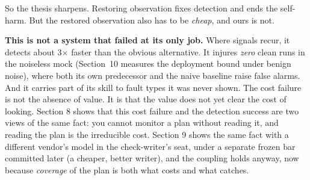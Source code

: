 \documentclass[acmsmall,screen]{acmart}
\begin{document}
So the thesis sharpens. Restoring observation fixes detection and ends the
self-harm. But the restored observation also has to be \emph{cheap}, and ours
is not.

\textbf{This is not a system that failed at its only job.} Where signals
recur, it detects about 3$\times$ faster than the obvious alternative. It
injures \emph{zero} clean runs in the noiseless mock (Section~10 measures the deployment
bound under benign noise), where both its own predecessor and the naive
baseline raise false alarms. And it carries part of its skill to fault types it
was never shown. The cost failure is not the absence of value. It is that the
value does not yet clear the cost of looking. Section 8 shows that this cost
failure and the detection success are two views of the same fact: you cannot
monitor a plan without reading it, and reading the plan is the irreducible cost.
Section 9 shows the same fact with a different vendor's model in the
check-writer's seat, under a separate frozen bar committed later (a cheaper,
better writer), and the coupling holds anyway, now because \emph{coverage} of the
plan is both what costs and what catches.
\end{document}
